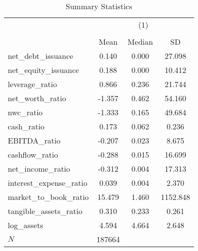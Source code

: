 \begin{table}[htbp]\centering
\def\sym#1{\ifmmode^{#1}\else\(^{#1}\)\fi}
\caption{Summary Statistics}
\begin{tabular}{l*{1}{ccc}}
\hline\hline
            &\multicolumn{3}{c}{(1)}               \\
            &\multicolumn{3}{c}{}                  \\
            &        Mean&      Median&          SD\\
\hline
net\_debt\_issuance&       0.140&       0.000&      27.098\\
net\_equity\_issuance&       0.188&       0.000&      10.412\\
leverage\_ratio&       0.866&       0.236&      21.744\\
net\_worth\_ratio&      -1.357&       0.462&      54.160\\
nwc\_ratio   &      -1.333&       0.165&      49.684\\
cash\_ratio  &       0.173&       0.062&       0.236\\
EBITDA\_ratio&      -0.207&       0.023&       8.675\\
cashflow\_ratio&      -0.288&       0.015&      16.699\\
net\_income\_ratio&      -0.312&       0.004&      17.313\\
interest\_expense\_ratio&       0.039&       0.004&       2.370\\
market\_to\_book\_ratio&      15.479&       1.460&    1152.848\\
tangible\_assets\_ratio&       0.310&       0.233&       0.261\\
log\_assets  &       4.594&       4.664&       2.648\\
\hline
\(N\)       &      187664&            &            \\
\hline\hline
\end{tabular}
\end{table}
